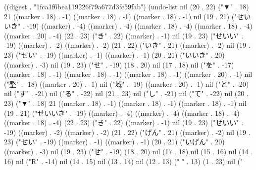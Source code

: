 
((digest . "1fca1f6bea119226f79a677d3fc59fab") (undo-list nil (20 . 22) ("▼" . 18) 21 ((marker . 18) . -1) ((marker . 18) . -1) ((marker . 18) . -1) nil (19 . 21) ("せいいき" . -19) ((marker) . -4) ((marker) . -4) ((marker . 18) . -4) ((marker . 18) . -4) ((marker . 20) . -4) (22 . 23) ("き" . 22) ((marker) . -1) nil (19 . 23) ("せいい" . -19) ((marker) . -2) ((marker) . -2) (21 . 22) ("いき" . 21) ((marker) . -2) nil (19 . 23) ("せい" . -19) ((marker) . -1) ((marker) . -1) (20 . 21) ("いいき" . 20) ((marker) . -3) nil (19 . 23) ("せ" . -19) (18 . 20) nil (17 . 18) nil ("を" . -17) ((marker . 18) . -1) ((marker . 18) . -1) ((marker . 18) . -1) ((marker . 20) . -1) nil ("整" . -18) ((marker . 20) . -1) nil ("域" . -19) ((marker . 20) . -1) nil ("と" . -20) nil ("す" . -21) nil ("る" . -22) nil (21 . 23) nil ("し" . -21) nil ("て" . -22) nil (20 . 23) ("▼" . 18) 21 ((marker . 18) . -1) ((marker . 18) . -1) ((marker . 18) . -1) nil (19 . 21) ("せいいき" . -19) ((marker) . -4) ((marker) . -4) ((marker . 18) . -4) ((marker . 18) . -4) (22 . 23) ("き" . 22) ((marker) . -1) nil (19 . 23) ("せいい" . -19) ((marker) . -2) ((marker) . -2) (21 . 22) ("げん" . 21) ((marker) . -2) nil (19 . 23) ("せい" . -19) ((marker) . -1) ((marker) . -1) (20 . 21) ("いげん" . 20) ((marker) . -3) nil (19 . 23) ("せ" . -19) (18 . 20) nil (17 . 18) nil (15 . 16) nil (14 . 16) nil ("R" . -14) nil (14 . 15) nil (13 . 14) nil (12 . 13) (" " . 13) (1 . 23) nil ("%